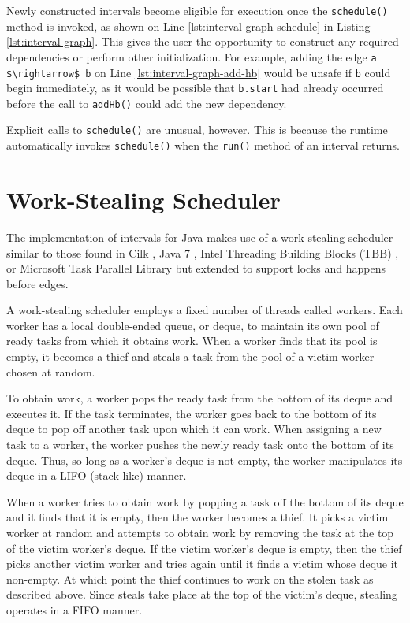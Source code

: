 Newly constructed intervals become eligible for execution once the
\lstinline|schedule()| method is invoked, as shown on Line
\ref{lst:interval-graph-schedule} in Listing
\ref{lst:interval-graph}. This gives the user the opportunity to
construct any required dependencies or perform other
initialization. For example, adding the edge
\lstinline|a $\rightarrow$ b| on Line \ref{lst:interval-graph-add-hb}
would be unsafe if \lstinline|b| could begin immediately, as it would
be possible that \lstinline|b.start| had already occurred before the
call to \lstinline|addHb()| could add the new dependency.

Explicit calls to \lstinline|schedule()| are unusual, however. This is
because the runtime automatically invokes \lstinline|schedule()| when
the \lstinline|run()| method of an interval returns.


\section{Work-Stealing Scheduler}
\label{sec:intro-work-stealing-scheduler}

The implementation of intervals for Java makes use of a work-stealing
scheduler similar to those found in Cilk \cite{Blumofe1995,
  Frigo1998}, Java 7 \cite{Lea2000, Lea2000a, Lea2004, Lea2006}, Intel
Threading Building Blocks (TBB) \cite{Reinders2007, Contreras2008}, or
Microsoft Task Parallel Library \cite{Leijen2009} but extended to
support locks and happens before edges.

A work-stealing scheduler employs a fixed number of threads called
workers. Each worker has a local double-ended queue, or deque, to
maintain its own pool of ready tasks from which it obtains work. When
a worker finds that its pool is empty, it becomes a thief and steals a
task from the pool of a victim worker chosen at random.

To obtain work, a worker pops the ready task from the bottom of its
deque and executes it. If the task terminates, the worker goes back to
the bottom of its deque to pop off another task upon which it can
work. When assigning a new task to a worker, the worker pushes the
newly ready task onto the bottom of its deque. Thus, so long as a
worker's deque is not empty, the worker manipulates its deque in a
LIFO (stack-like) manner.

When a worker tries to obtain work by popping a task off the bottom of
its deque and it finds that it is empty, then the worker becomes a
thief. It picks a victim worker at random and attempts to obtain work
by removing the task at the top of the victim worker's deque. If the
victim worker's deque is empty, then the thief picks another victim
worker and tries again until it finds a victim whose deque it
non-empty. At which point the thief continues to work on the stolen
task as described above. Since steals take place at the top of the
victim's deque, stealing operates in a FIFO manner.

